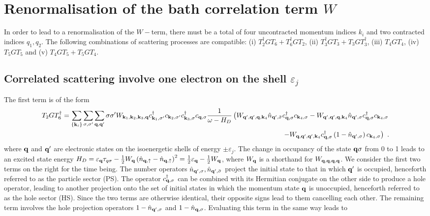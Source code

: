 \documentclass{revtex4-2}
\begin{document}
\section{Renormalisation of the bath correlation term \(W\)}
In order to lead to a renormalisation of the \(W-\)term, there must be a total of four uncontracted momentum indices \(k_i\) and two contracted indices \(q_1, q_2\). The following combinations of scattering processes are compatible: (i) \(T_2^\dagger G T_6 + T_6^\dagger G T_2\), (ii) \(T_3^\dagger G T_3 + T_3 G T_3^\dagger\), (iii) \(T_4 G T_4\), (iv) \(T_5 G T_5\) and (v) \(T_4 G T_5 + T_5 G T_4\).

\subsection{Correlated scattering involve one electron on the shell \(\varepsilon_j\)}
The first term is of the form
\begin{equation}\begin{aligned}
		T_2 G T_6^\dagger = \sum_{\left\{ {\bf k}_i \right\} }\sum_{\sigma,\sigma^\prime}\sum_{{\bf q}, {\bf q}^\prime} \sigma\sigma^\prime W_{{\bf k}_1,{\bf k}_2,{\bf k}_3,{\bf q}} c^\dagger_{{\bf k}_1, \sigma^\prime}c_{{\bf k}_2,\sigma^\prime}c^\dagger_{{\bf k}_3,\sigma}c_{{\bf q},\sigma} \frac{1}{\omega - H_D}\left(W_{{{\bf q}^\prime},{{\bf q}^\prime},{\bf q},{\bf k}_4} \hat n_{{{\bf q}^\prime},\bar\sigma}c^\dagger_{{\bf q},\sigma}c_{{\bf k}_4,\sigma} - W_{{{\bf q}^\prime},{{\bf q}^\prime},{\bf q},{\bf k}_4}\hat n_{{{\bf q}^\prime},\sigma}c^\dagger_{{\bf q},\sigma}c_{{\bf k}_4,\sigma} \right.\\
		\left.- W_{{\bf q},{{\bf q}^\prime},{{\bf q}^\prime},{\bf k}_4}c^\dagger_{{\bf q},\sigma}\left(1 - \hat n_{{{\bf q}^\prime},\sigma}\right) c_{{\bf k}_4,\sigma}\right)~.
\end{aligned}\end{equation}
where \({\bf q}\) and \({\bf q}^\prime\) are electronic states on the isoenergetic shells of energy \(\pm \varepsilon_j\). The change in occupancy of the state \({\bf q}\sigma\) from 0 to 1 leads to an excited state energy \(H_D = \varepsilon_{{\bf q}}\tau_{q\sigma} - \frac{1}{2}W_{{\bf q}}\left(\hat n_{{\bf q}, \uparrow} - \hat n_{{\bf q}, \uparrow}\right)^2 = \frac{1}{2}\varepsilon_{{\bf q}} - \frac{1}{2}W_{{\bf q}}\), where \(W_{{\bf q}}\) is a shorthand for \(W_{{\bf q},{\bf q},{\bf q},{\bf q}}\). We consider the first two terms on the right for the time being. The number operators \(\hat n_{{{\bf q}^\prime},\sigma}, \hat n_{{{\bf q}^\prime},\bar\sigma}\) project the initial state to that in which \({{\bf q}^\prime}\) is occupied, henceforth referred to as the particle sector (PS). The operator \(c^\dagger_{{\bf q},\sigma}\) can be combined with its Hermitian conjugate on the other side to produce a hole operator, leading to another projection onto the set of initial states in which the momentum state \({{\bf q}}\) is unoccupied, henceforth referred to as the hole sector (HS). Since the two terms are otherwise identical, their opposite signs lead to them cancelling each other. The remaining term involves the hole projection operators \(1 - \hat n_{{{\bf q}^\prime},\sigma}\) and \(1 - \hat n_{{{\bf q}},\sigma}\). Evaluating this term in the same way leads to
\end{document}
